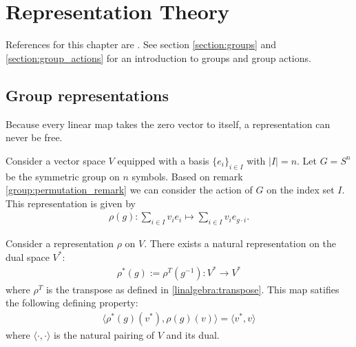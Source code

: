 \chapter{Representation Theory}

    References for this chapter are \cite{fultonharris, jeevanjee}. See section \ref{section:groups} and \ref{section:group_actions} for an introduction to groups and group actions.

\section{Group representations}

    \begin{property}
        Because every linear map takes the zero vector to itself, a representation can never be free.
    \end{property}


    \begin{example}
        Consider a vector space $V$ equipped with a basis $\{e_i\}_{i\in I}$ with $|I| = n$. Let $G = S^n$ be the symmetric group on $n$ symbols. Based on remark \ref{group:permutation_remark} we can consider the action of $G$ on the index set $I$. This representation is given by
        \begin{gather}
            \rho(g):\sum_{i\in I}v_ie_i\mapsto\sum_{i\in I}v_ie_{g\cdot i}.
        \end{gather}
    \end{example}

    \begin{example}
        Consider a representation $\rho$ on $V$. There exists a natural representation on the dual space $V^*$:
        \begin{gather}
            \rho^*(g) := \rho^T(g^{-1}): V^*\rightarrow V^*
        \end{gather}
        where $\rho^T$ is the transpose as defined in \ref{linalgebra:transpose}. This map satifies the following defining property:
        \begin{gather}
            \Big\langle\rho^*(g)(v^*), \rho(g)(v)\Big\rangle = \langle v^*, v\rangle
        \end{gather}
        where $\langle\cdot,\cdot\rangle$ is the natural pairing of $V$ and its dual.
    \end{example}

